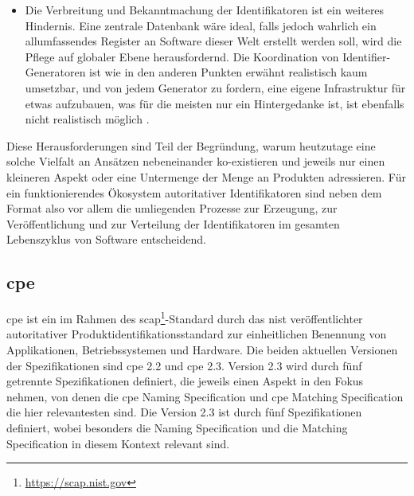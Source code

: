 \begin{itemize}
    \item Die Verbreitung und Bekanntmachung der Identifikatoren ist ein weiteres Hindernis.
    Eine zentrale Datenbank wäre ideal, falls jedoch wahrlich ein allumfassendes Register an Software dieser Welt erstellt werden soll, wird die Pflege auf globaler Ebene herausfordernd.
    Die Koordination von Identifier-Generatoren ist wie in den anderen Punkten erwähnt realistisch kaum umsetzbar, und von jedem Generator zu fordern, eine eigene Infrastruktur für etwas aufzubauen, was für die meisten nur ein Hintergedanke ist, ist ebenfalls nicht realistisch möglich \autocite{CISA2023}.
\end{itemize}

Diese Herausforderungen sind Teil der Begründung, warum heutzutage eine solche Vielfalt an Ansätzen nebeneinander ko-existieren und jeweils nur einen kleineren Aspekt oder eine Untermenge der Menge an Produkten adressieren.
Für ein funktionierendes Ökosystem autoritativer Identifikatoren sind neben dem Format also vor allem die umliegenden Prozesse zur Erzeugung, zur Veröffentlichung und zur Verteilung der Identifikatoren im gesamten Lebenszyklus von Software entscheidend.

\subsection{\acrfull{cpe}}\label{subsec:cpe-description}


\acrshort{cpe} ist ein im Rahmen des \acrfull{scap}\footnote{\url{https://scap.nist.gov}}-Standard durch das \acrshort{nist} veröffentlichter autoritativer Produktidentifikationsstandard zur einheitlichen Benennung von Applikationen, Betriebssystemen und Hardware.
Die beiden aktuellen Versionen der Spezifikationen sind \acrshort{cpe} 2.2 und \acrshort{cpe} 2.3.
Version 2.3 wird durch fünf getrennte Spezifikationen definiert, die jeweils einen Aspekt in den Fokus nehmen, von denen die \acrshort{cpe} Naming Specification \autocite{Cheikes_Waltermire_Scarfone_2011} und \acrshort{cpe} Matching Specification \autocite{Parmelee_Booth_Waltermire_Scarfone_2011} die hier relevantesten sind.
Die Version 2.3 ist durch fünf Spezifikationen definiert, wobei besonders die Naming Specification \autocite{Cheikes_Waltermire_Scarfone_2011} und die Matching Specification \autocite{Parmelee_Booth_Waltermire_Scarfone_2011} in diesem Kontext relevant sind.

